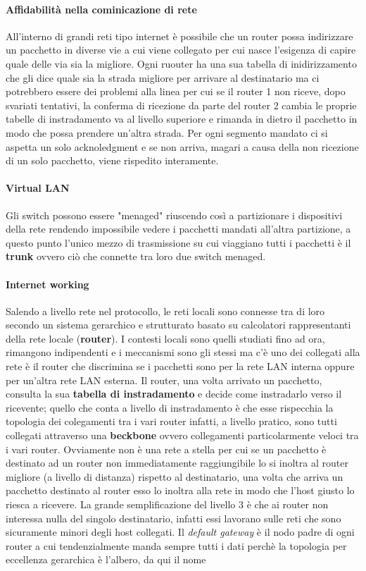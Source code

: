 \documentclass{article}
\begin{document}
\paragraph{Affidabilità nella cominicazione di rete}
All'interno di grandi reti tipo internet è possibile che un router possa
indirizzare un pacchetto in diverse vie a cui viene collegato per cui nasce
l'esigenza di capire quale delle via sia la migliore. Ogni ruouter ha una sua
tabella di inidirizzamento che gli dice quale sia la strada migliore per
arrivare al destinatario ma ci potrebbero essere dei problemi alla linea per
cui se il router 1 non riceve, dopo svariati tentativi, la conferma di
ricezione da parte del router 2 cambia le proprie tabelle di instradamento va
al livello superiore e rimanda in dietro il pacchetto in modo che possa
prendere un'altra strada. Per ogni segmento mandato ci si aspetta un solo
acknoledgment e se non arriva, magari a causa della non ricezione di un solo
pacchetto, viene rispedito interamente.

\paragraph{Virtual LAN}
Gli switch possono essere "menaged" riuscendo così a partizionare i dispositivi
della rete rendendo impossibile vedere i pacchetti mandati all'altra
partizione, a questo punto l'unico mezzo di trasmissione su cui viaggiano tutti
i pacchetti è il \textbf{trunk} ovvero ciò che connette tra loro due switch
menaged.

\paragraph{Internet working}
Salendo a livello rete nel protocollo, le reti locali sono connesse tra di loro
secondo un sistema gerarchico e strutturato basato su calcolatori
rappresentanti della rete locale (\textbf{router}). I contesti locali sono
quelli studiati fino ad ora, rimangono indipendenti e i meccanismi sono gli
stessi ma c'è uno dei collegati alla rete è il router che discrimina se i
pacchetti sono per la rete LAN interna oppure per un'altra rete LAN esterna. Il
router, una volta arrivato un pacchetto, consulta la sua \textbf{tabella di
    instradamento} e decide come instradarlo verso il ricevente; quello che conta a
livello di instradamento è che esse rispecchia la topologia dei colegamenti tra
i vari router infatti, a livello pratico, sono tutti collegati attraverso una
\textbf{beckbone} ovvero collegamenti particolarmente veloci tra i vari router.
Ovviamente non è una rete a stella per cui se un pacchetto è destinato ad un
router non immediatamente raggiungibile lo si inoltra al router migliore (a
livello di distanza) rispetto al destinatario, una volta che arriva un
pacchetto destinato al router esso lo inoltra alla rete in modo che l'host
giusto lo riesca a ricevere. La grande semplificazione del livello 3 è che ai
router non interessa nulla del singolo destinatario, infatti essi lavorano
sulle reti che sono sicuramente minori degli host collegati. Il \textit{default
    gateway} è il nodo padre di ogni router a cui tendenzialmente manda sempre
tutti i dati perchè la topologia per eccellenza gerarchica è l'albero, da qui
il nome
\end{document}
